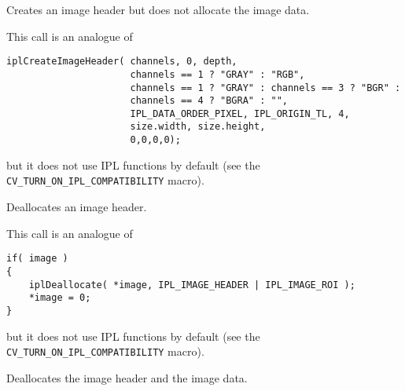 \label{CreateImageHeader}

Creates an image header but does not allocate the image data.


\begin{description}
\end{description}

This call is an analogue of

\begin{lstlisting}
iplCreateImageHeader( channels, 0, depth,
                      channels == 1 ? "GRAY" : "RGB",
                      channels == 1 ? "GRAY" : channels == 3 ? "BGR" :
                      channels == 4 ? "BGRA" : "",
                      IPL_DATA_ORDER_PIXEL, IPL_ORIGIN_TL, 4,
                      size.width, size.height,
                      0,0,0,0);
\end{lstlisting}

but it does not use IPL functions by default (see the \texttt{CV\_TURN\_ON\_IPL\_COMPATIBILITY} macro).

\label{ReleaseImageHeader}

Deallocates an image header.


\begin{description}
\end{description}

This call is an analogue of

\begin{lstlisting}
if( image )
{
    iplDeallocate( *image, IPL_IMAGE_HEADER | IPL_IMAGE_ROI );
    *image = 0;
}
\end{lstlisting}

but it does not use IPL functions by default (see the \texttt{CV\_TURN\_ON\_IPL\_COMPATIBILITY} macro).



Deallocates the image header and the image data.

